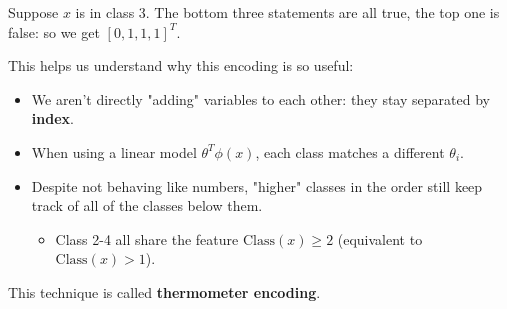                 \miniex Suppose $x$ is in class 3. The bottom three statements are all true, the top one is false: so we get $[0, 1, 1, 1]^T$. 

                This helps us understand why this encoding is so useful:
                
                \begin{itemize}
                    \item We aren't directly "adding" variables to each other: they stay separated by \textbf{index}.
                    
                    \item When using a linear model $\theta^T\phi(x)$, each class  matches a different $\theta_i$.
                        
                    \item Despite not behaving like numbers, "higher" classes in the order still keep track of all of the classes below them.
                        \begin{itemize}
                            \item \miniex Class 2-4 all share the feature $\text{Class}(x)\geq 2$ (equivalent to $\text{Class}(x)>1$).
                        \end{itemize}
                \end{itemize}

                This technique is called \textbf{thermometer encoding}.\\

